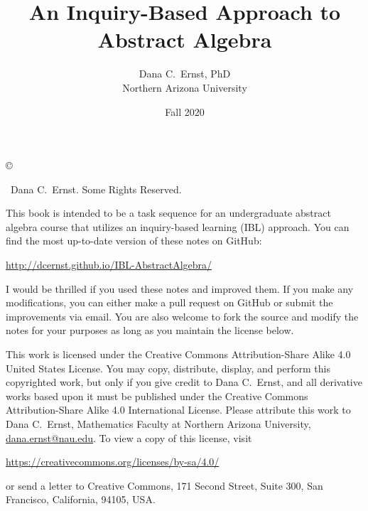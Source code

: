 \documentclass[12pt,oneside]{book}
\theoremstyle{definition}
\begin{document}
\title{An Inquiry-Based Approach to Abstract Algebra}
\author{Dana C.~Ernst, PhD\\
Northern Arizona University}
\date{Fall 2020}

\maketitle

\noindent\copyright{ \the\year\ Dana C.~Ernst.  Some Rights Reserved.\\

\bigskip

\noindent This book is intended to be a task sequence for an undergraduate abstract algebra course that utilizes an inquiry-based learning (IBL) approach.  You can find the most up-to-date version of these notes on GitHub:
\begin{center}
\url{http://dcernst.github.io/IBL-AbstractAlgebra/}
\end{center}
I would be thrilled if you used these notes and improved them. If you make any modifications, you can either make a pull request on GitHub or submit the improvements via email.  You are also welcome to fork the source and modify the notes for your purposes as long as you maintain the license below.

\bigskip

\noindent This work is licensed under the Creative Commons Attribution-Share Alike 4.0 United States License.  You may copy, distribute, display, and perform this copyrighted work, but only if you give credit to Dana C.~Ernst, and all derivative works based upon it must be published under the Creative Commons Attribution-Share Alike 4.0 International License. Please attribute this work to Dana C.~Ernst, Mathematics Faculty at Northern Arizona University, \url{dana.ernst@nau.edu}. To view a copy of this license, visit
\begin{center}
\url{https://creativecommons.org/licenses/by-sa/4.0/}
\end{center}
or send a letter to Creative Commons, 171 Second Street, Suite 300, San Francisco, California, 94105, USA.}

\medskip

\begin{center}
\ccbysa
\end{center}
\end{document}
